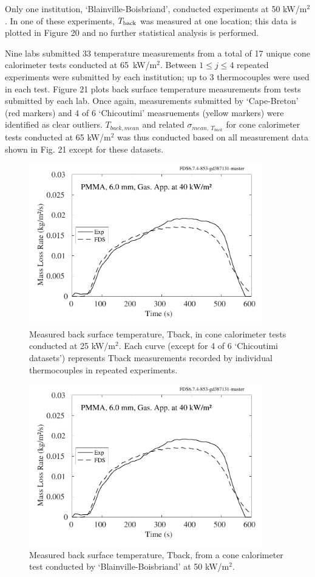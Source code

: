 \documentclass{book}
\begin{document}
Only one institution, ‘Blainville-Boisbriand’, conducted experiments at 50 kW/m$^2$. In one of these experiments, $T_{\rm back}$ was measured at one location; this data is plotted in Figure 20 and no further statistical analysis is performed.

Nine labs submitted 33 temperature measurements from a total of 17 unique cone calorimeter tests conducted at 65~kW/m$^2$. Between $1\le j\le4$ repeated experiments were submitted by each institution; up to 3 thermocouples were used in each test. Figure 21 plots back surface temperature measurements from tests submitted by each lab. Once again, measurements  submitted by ‘Cape-Breton’ (red markers) and 4 of 6 ‘Chicoutimi’ measruements (yellow markers) were identified as clear outliers. $T_{back,mean}$ and related $\sigma_{mean,\ T_{back}}$ for cone calorimeter tests conducted at 65 kW/m$^2$ was thus conducted based on all measurement data shown in Fig. 21 except for these datasets.



\begin{figure}
  \centering
  \includegraphics[width=4in]{SCRIPT_FIGURES/PMMA_40}
  \caption{Measured back surface temperature, Tback, in cone calorimeter tests conducted at 25 kW/m$^2$. Each curve (except for 4 of 6 ‘Chicoutimi datasets’) represents Tback measurements recorded by individual thermocouples in repeated experiments.}
  \label{Fig_19}
\end{figure}

\begin{figure}
  \centering
  \includegraphics[width=4in]{SCRIPT_FIGURES/PMMA_40}
  \caption{Measured back surface temperature, Tback, from a cone calorimeter test conducted by ‘Blainville-Boisbriand’ at 50 kW/m$^2$.}
  \label{Fig_20}
\end{figure}
\end{document}

